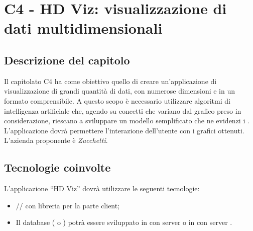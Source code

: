 \section{C4 - HD Viz: visualizzazione di dati multidimensionali}

\subsection{Descrizione del capitolo}
Il capitolato C4 ha come obiettivo quello di creare un'applicazione di visualizzazione di grandi quantità di dati, con numerose dimensioni e in un formato comprensibile. A questo scopo è necessario utilizzare algoritmi di intelligenza artificiale che, agendo su concetti che variano dal grafico preso in considerazione, riescano a sviluppare un modello semplificato che ne evidenzi i . 
L'applicazione dovrà permettere l'interazione dell'utente con i grafici ottenuti.\\
L'azienda proponente è \textit{Zucchetti}.

\subsection{Tecnologie coinvolte}
L'applicazione “HD Viz” dovrà utilizzare le seguenti tecnologie:
\begin{itemize}
\item {}// con libreria  per la parte client;
\item Il database ( o ) potrà essere sviluppato in  con server  o in  con server .
\end{itemize}

